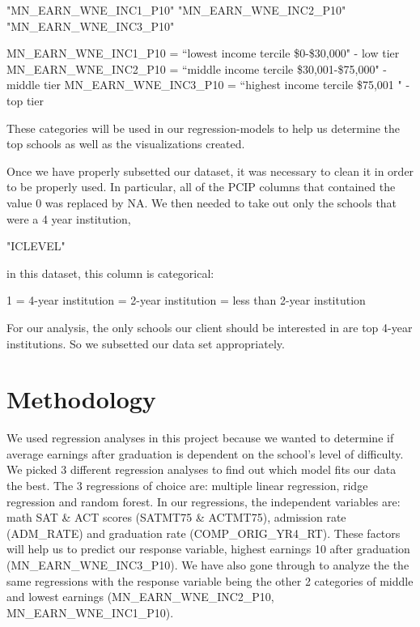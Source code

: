 \documentclass{article}
\begin{document}
\begin{Schunk}
\begin{Soutput}
[1] "MN_EARN_WNE_INC1_P10" "MN_EARN_WNE_INC2_P10" "MN_EARN_WNE_INC3_P10"
\end{Soutput}
\end{Schunk}
\begin{flushleft}
MN\_EARN\_WNE\_INC1\_P10 = ``lowest income tercile \$0-\$30,000" - low tier \newline
MN\_EARN\_WNE\_INC2\_P10 = ``middle income tercile \$30,001-\$75,000" - middle tier \newline
MN\_EARN\_WNE\_INC3\_P10 = ``highest income tercile \$75,001  " - top tier \newline
\end{flushleft}
These categories will be used in our regression-models to help us determine the top schools as well as the visualizations created.

Once we have properly subsetted our dataset, it was necessary to clean it in order to be properly used.  In particular, all of the PCIP columns that contained the value 0 was replaced by NA.  We then needed to take out only the schools that were a 4 year institution, 
\begin{Schunk}
\begin{Soutput}
[1] "ICLEVEL"
\end{Soutput}
\end{Schunk}
in this dataset, this column is categorical: 
  \begin{flushleft}
  1 = 4-year institution  = 2-year institution  = less than 2-year institution \newline
  \end{flushleft}
  For our analysis, the only schools our client should be interested in are top 4-year institutions.  So we subsetted our data set appropriately.

\section{Methodology}

We used regression analyses in this project because we wanted to determine if average earnings after graduation is dependent on the school's level of difficulty.  
We picked 3 different regression analyses to find out which model fits our data the best.  
The 3 regressions of choice are: multiple linear regression, ridge regression and random forest.   
In our regressions, the independent variables are: math SAT \& ACT scores (SATMT75 \& ACTMT75), admission rate (ADM\_RATE) and graduation rate (COMP\_ORIG\_YR4\_RT).  These factors will help us to predict our 
response variable, highest earnings 10 after graduation (MN\_EARN\_WNE\_INC3\_P10).  We have also gone through to analyze the the same regressions with the response variable being the other 2 categories of middle and lowest earnings (MN\_EARN\_WNE\_INC2\_P10, MN\_EARN\_WNE\_INC1\_P10).  
\end{document}
